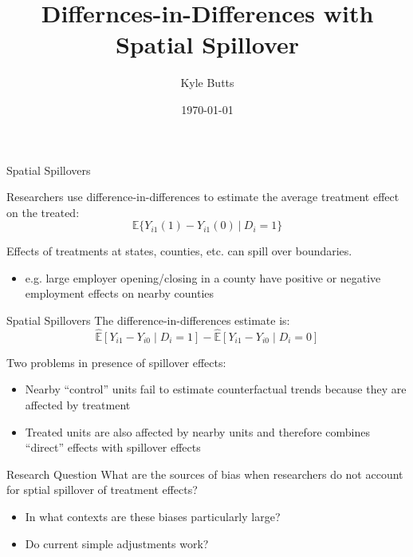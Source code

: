 \documentclass[aspectratio=43]{beamer}
\title{Differnces-in-Differences with Spatial Spillover}
\date{\today}
\author{Kyle Butts}
\begin{document}
\maketitle

\begin{frame}{Spatial Spillovers}
    
    Researchers use difference-in-differences to estimate the average treatment effect on the treated: 
    \[
        \mathbb{E} \{ Y_{i1}(1) - Y_{i1}(0) \ \vert \ D_{i} = 1 \}
    \]
        
    Effects of treatments at states, counties, etc. can spill over boundaries.
        
    \begin{itemize}
        \item e.g. large employer opening/closing in a county have positive or negative employment effects on nearby counties
    \end{itemize}
\end{frame}

\begin{frame}{Spatial Spillovers}
    The difference-in-differences estimate is: 
    \[ 
        \hat{\mathbb{E}} \left[ Y_{i1} - Y_{i0} \mid D_i = 1 \right] - 
        \hat{\mathbb{E}} \left[ Y_{i1} - Y_{i0} \mid D_i = 0 \right]     
    \]

    Two problems in presence of spillover effects: 
    \begin{itemize}
        \item Nearby ``control'' units fail to estimate counterfactual trends because they are affected by treatment
        
        \item Treated units are also affected by nearby units and therefore combines ``direct'' effects with spillover effects
    \end{itemize}

\end{frame}

\begin{frame}{Research Question}
    What are the sources of bias when researchers do not account for sptial spillover of treatment effects? 
        
    \begin{itemize}
        \item In what contexts are these biases particularly large?
        
        \item Do current simple adjustments work?
    \end{itemize}
\end{frame}
\end{document}
